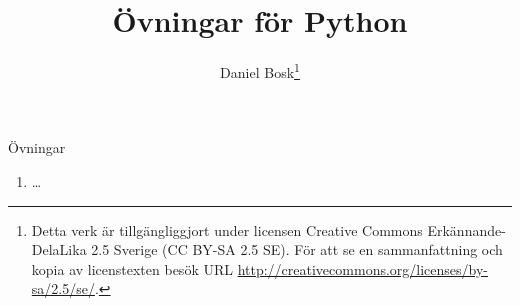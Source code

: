 \documentclass[handout]{beamer}
\title{%
  Övningar för Python
}
\author{Daniel Bosk\footnote{%
  Detta verk är tillgängliggjort under licensen Creative Commons 
  Erkännande-DelaLika 2.5 Sverige (CC BY-SA 2.5 SE).
	För att se en sammanfattning och kopia av licenstexten besök URL 
	\url{http://creativecommons.org/licenses/by-sa/2.5/se/}.
}}
\institute{%
  Avdelningen för informations- och kommunikationssytem (IKS),\\
  Mittuniversitetet, Sundsvall.
}
\date{\svnId}
\begin{document}
\begin{frame}
  \titlepage
\end{frame}

%  

\begin{frame}{Övningar}
  \begin{enumerate}
    \item \dots
  \end{enumerate}
\end{frame}



%  
\end{document}
